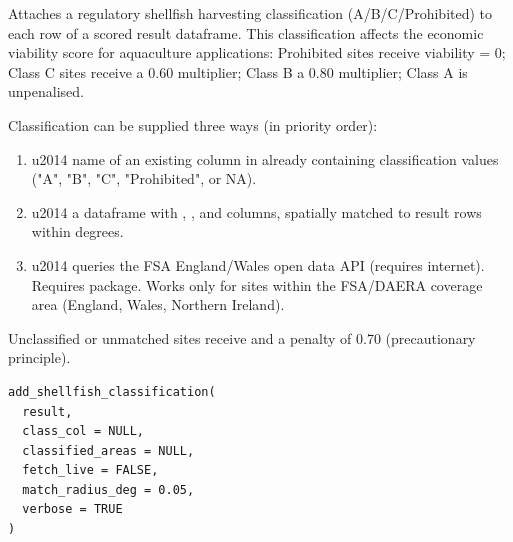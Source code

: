 \documentclass[a4paper]{book}
\begin{document}
%
\begin{Description}
Attaches a regulatory shellfish harvesting classification (A/B/C/Prohibited)
to each row of a scored result dataframe. This classification affects the
economic viability score for aquaculture applications: Prohibited sites
receive viability = 0; Class C sites receive a 0.60 multiplier; Class B a
0.80 multiplier; Class A is unpenalised.

Classification can be supplied three ways (in priority order):
\begin{enumerate}

\item{}  \bsl{}u2014 name of an existing column in  already
containing classification values ("A", "B", "C", "Prohibited", or NA).
\item{}  \bsl{}u2014 a dataframe with , , and
 columns, spatially matched to result rows within
 degrees.
\item{}  \bsl{}u2014 queries the FSA England/Wales open data API
(requires internet). Requires  package. Works only for sites
within the FSA/DAERA coverage area (England, Wales, Northern Ireland).

\end{enumerate}


Unclassified or unmatched sites receive 
and a penalty of 0.70 (precautionary principle).
\end{Description}
%
\begin{Usage}
\begin{verbatim}
add_shellfish_classification(
  result,
  class_col = NULL,
  classified_areas = NULL,
  fetch_live = FALSE,
  match_radius_deg = 0.05,
  verbose = TRUE
)
\end{verbatim}
\end{Usage}
%
\end{document}
